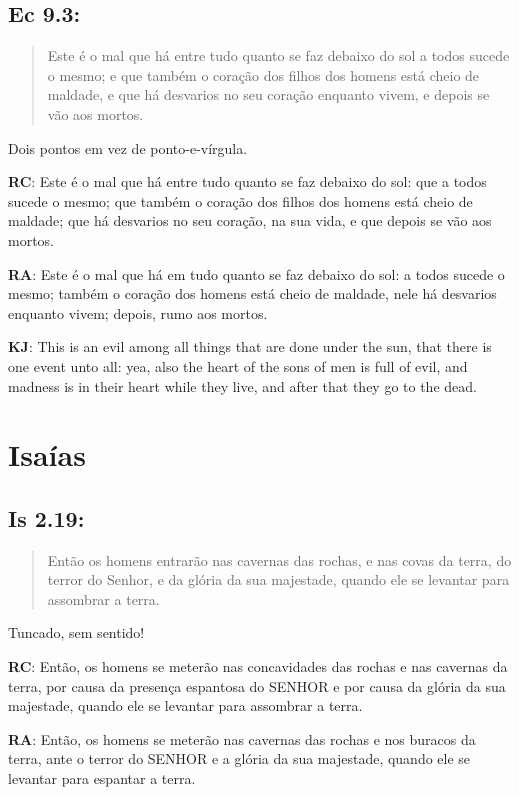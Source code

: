 \subsection*{Ec 9.3:} 
 \begin{quote}
  \small
 Este é o mal que há entre tudo quanto se faz debaixo do sol\uwave{;} a todos sucede o mesmo; e que também o coração dos filhos dos homens está cheio de maldade, e que há desvarios no seu coração enquanto vivem, e depois se vão aos mortos.
 \end{quote}

Dois pontos em vez de ponto-e-vírgula.

\textbf{RC}: Este é o mal que há entre tudo quanto se faz debaixo do sol: que a todos sucede o mesmo; que também o coração dos filhos dos homens está cheio de maldade; que há desvarios no seu coração, na sua vida, e que depois se vão aos mortos.

\textbf{RA}: Este é o mal que há em tudo quanto se faz debaixo do sol: a todos sucede o mesmo; também o coração dos homens está cheio de maldade, nele há desvarios enquanto vivem; depois, rumo aos mortos.

\textbf{KJ}: This is an evil among all things that are done under the sun, that there is one event unto all: yea, also the heart of the sons of men is full of evil, and madness is in their heart while they live, and after that they go to the dead.

\section{Isaías}
\subsection*{Is 2.19:} 
 \begin{quote}
  \small
 Então os homens entrarão nas cavernas das rochas, e nas covas da terra, do terror do Senhor, e da glória da sua majestade, quando ele se levantar para assombrar a terra.
 \end{quote}
 
Tuncado, sem sentido!

\textbf{RC}: Então, os homens se meterão nas concavidades das rochas e nas cavernas da terra, por causa da presença espantosa do SENHOR e por causa da glória da sua majestade, quando ele se levantar para assombrar a terra.

\textbf{RA}: Então, os homens se meterão nas cavernas das rochas e nos buracos da terra, ante o terror do SENHOR e a glória da sua majestade, quando ele se levantar para espantar a terra.

